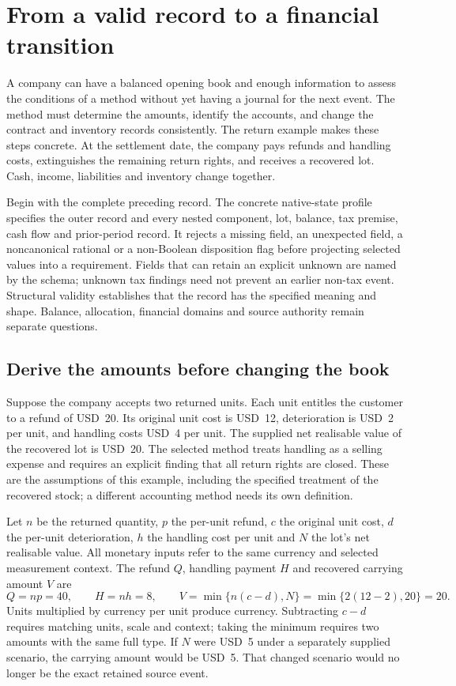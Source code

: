 \section{From a valid record to a financial transition}
\label{sec:typed-return-transitions}

A company can have a balanced opening book and enough information to assess
the conditions of a method without yet having a journal for the next event.
The method must determine the amounts, identify the accounts, and change the
contract and inventory records consistently. The return example makes these
steps concrete. At the settlement date, the company pays refunds and handling
costs, extinguishes the remaining return rights, and receives a recovered lot.
Cash, income, liabilities and inventory change together.

Begin with the complete preceding record. The concrete native-state profile
specifies the outer record and every nested component, lot, balance, tax premise,
cash flow and prior-period record. It rejects a missing field, an unexpected
field, a noncanonical rational or a non-Boolean disposition flag before projecting
selected values into a requirement. Fields that can retain an explicit unknown
are named by the schema; unknown tax findings need not prevent an earlier
non-tax event. Structural validity establishes that the record has the specified
meaning and shape. Balance, allocation, financial domains and source authority
remain separate questions.

\subsection{Derive the amounts before changing the book}

Suppose the company accepts two returned units. Each unit entitles the customer
to a refund of USD~20. Its original unit cost is USD~12, deterioration is USD~2
per unit, and handling costs USD~4 per unit. The supplied net realisable value
of the recovered lot is USD~20. The selected method treats handling as a selling
expense and requires an explicit finding that all return rights are closed.
These are the assumptions of this example, including the specified treatment
of the recovered stock; a different accounting method needs its own definition.

Let $n$ be the returned quantity, $p$ the per-unit refund, $c$ the original unit
cost, $d$ the per-unit deterioration, $h$ the handling cost per unit and $N$ the
lot's net realisable value. All monetary inputs refer to the same currency and
selected measurement context. The refund $Q$, handling payment $H$ and recovered
carrying amount $V$ are
\begin{equation}
 Q=np=40,\qquad H=nh=8,\qquad
 V=\min\{n(c-d),N\}=\min\{2(12-2),20\}=20.
\label{eq:typed-return-amounts}
\end{equation}
Units multiplied by currency per unit produce currency. Subtracting $c-d$
requires matching units, scale and context; taking the minimum requires two
amounts with the same full type. If $N$ were USD~5 under a separately supplied
scenario, the carrying amount would be USD~5. That changed scenario would no
longer be the exact retained source event.

